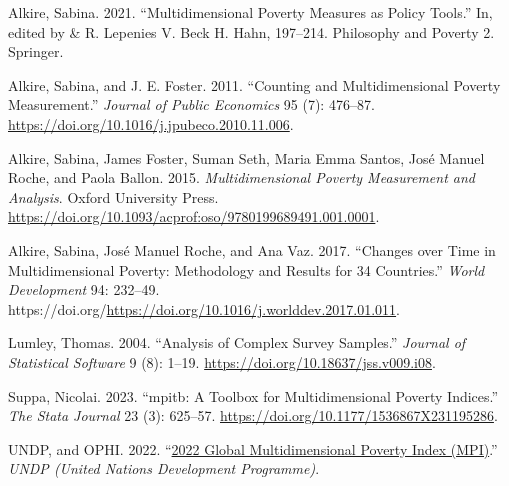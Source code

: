 \hypertarget{refs}{}
\begin{CSLReferences}{1}{0}
\leavevmode{}%
Alkire, Sabina. 2021. {``Multidimensional Poverty Measures as Policy Tools.''} In, edited by \& R. Lepenies V. Beck H. Hahn, 197--214. Philosophy and Poverty 2. Springer.

\leavevmode{}%
Alkire, Sabina, and J. E. Foster. 2011. {``Counting and Multidimensional Poverty Measurement.''} \emph{Journal of Public Economics} 95 (7): 476--87. \url{https://doi.org/10.1016/j.jpubeco.2010.11.006}.

\leavevmode{}%
Alkire, Sabina, James Foster, Suman Seth, Maria Emma Santos, José Manuel Roche, and Paola Ballon. 2015. \emph{Multidimensional Poverty Measurement and Analysis}. Oxford University Press. \url{https://doi.org/10.1093/acprof:oso/9780199689491.001.0001}.

\leavevmode{}%
Alkire, Sabina, José Manuel Roche, and Ana Vaz. 2017. {``Changes over Time in Multidimensional Poverty: Methodology and Results for 34 Countries.''} \emph{World Development} 94: 232--49. https://doi.org/\url{https://doi.org/10.1016/j.worlddev.2017.01.011}.

\leavevmode{}%
Lumley, Thomas. 2004. {``Analysis of Complex Survey Samples.''} \emph{Journal of Statistical Software} 9 (8): 1--19. \url{https://doi.org/10.18637/jss.v009.i08}.

\leavevmode{}%
Suppa, Nicolai. 2023. {``{m}pitb: A Toolbox for Multidimensional Poverty Indices.''} \emph{The Stata Journal} 23 (3): 625--57. \url{https://doi.org/10.1177/1536867X231195286}.

\leavevmode{}%
UNDP, and OPHI. 2022. {``\href{}{2022 Global Multidimensional Poverty Index (MPI)}.''} \emph{UNDP (United Nations Development Programme)}.

\end{CSLReferences}



\address{%
Ignacio Girela\\
CONICET - Universidad Nacional de Córdoba\\%
Facultad de Ciencias Económicas\\ Córdoba, Argentina\\
%
\url{https://www.eco.unc.edu.ar/}\\%
\textit{ORCiD: \href{https://orcid.org/0000-0003-3297-3854}{0000-0003-3297-3854}}\\%
\href{mailto:ignacio.girela@unc.edu.ar}{\nolinkurl{ignacio.girela@unc.edu.ar}}%
}
